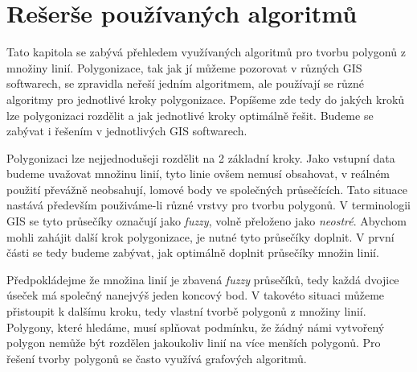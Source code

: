 \chapter{Rešerše používaných algoritmů}
\label{chap:reserzepouzivanychalgoritmu}
	Tato kapitola se zabývá přehledem využívaných algoritmů pro tvorbu polygonů z množiny linií. Polygonizace, tak jak jí můžeme pozorovat v různých GIS softwarech, se zpravidla neřeší jedním algoritmem, ale používají se různé algoritmy pro jednotlivé kroky polygonizace. Popíšeme zde tedy do jakých kroků lze polygonizaci rozdělit a jak jednotlivé kroky optimálně řešit. Budeme se zabývat i řešením v jednotlivých GIS softwarech.

	Polygonizaci lze nejjednodušeji rozdělit na 2 základní kroky. Jako vstupní data budeme uvažovat množinu linií, tyto linie ovšem nemusí obsahovat, v reálném použití převážně neobsahují, lomové body ve společných průsečících. Tato situace nastává především použiváme-li různé vrstvy pro tvorbu polygonů. V terminologii GIS se tyto průsečíky označují jako \textit{fuzzy}, volně přeloženo jako \textit{neostré}. Abychom mohli zahájit další krok polygonizace, je nutné tyto průsečíky doplnit. V první části se tedy budeme zabývat, jak optimálně doplnit průsečíky množin linií.
	
	Předpokládejme že množina linií je zbavená \textit{fuzzy} průsečíků, tedy každá dvojice úseček má společný nanejvýš jeden koncový bod. V takovéto situaci můžeme přistoupit k dalšímu kroku, tedy vlastní tvorbě polygonů z množiny linií. Polygony, které hledáme, musí splňovat podmínku, že žádný námi vytvořený polygon nemůže být rozdělen jakoukoliv linií na více menších polygonů. Pro řešení tvorby polygonů se často využívá grafových algoritmů.
	
